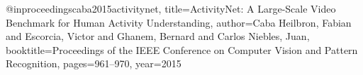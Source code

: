 @inproceedings{caba2015activitynet,
  title={ActivityNet: A Large-Scale Video Benchmark for Human Activity Understanding},
  author={Caba Heilbron, Fabian and Escorcia, Victor and Ghanem, Bernard and Carlos Niebles, Juan},
  booktitle={Proceedings of the IEEE Conference on Computer Vision and Pattern Recognition},
  pages={961--970},
  year={2015}
}

